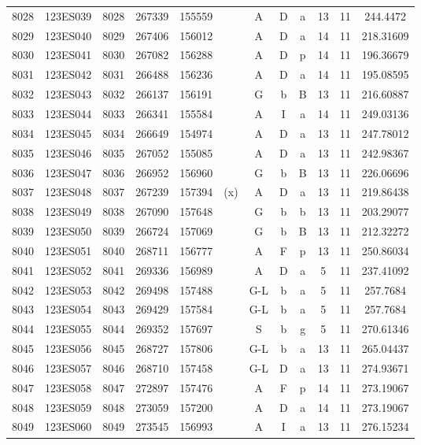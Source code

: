 \begin{tabular}{|*{12}{c|}}
8028 & 123ES039 & 8028 & 267339 & 155559 &  & A & D & a & 13 & 11 & 244.4472 \\ 
8029 & 123ES040 & 8029 & 267406 & 156012 &  & A & D & a & 14 & 11 & 218.31609 \\ 
8030 & 123ES041 & 8030 & 267082 & 156288 &  & A & D & p & 14 & 11 & 196.36679 \\ 
8031 & 123ES042 & 8031 & 266488 & 156236 &  & A & D & a & 14 & 11 & 195.08595 \\ 
8032 & 123ES043 & 8032 & 266137 & 156191 &  & G & b & B & 13 & 11 & 216.60887 \\ 
8033 & 123ES044 & 8033 & 266341 & 155584 &  & A & I & a & 14 & 11 & 249.03136 \\ 
8034 & 123ES045 & 8034 & 266649 & 154974 &  & A & D & a & 13 & 11 & 247.78012 \\ 
8035 & 123ES046 & 8035 & 267052 & 155085 &  & A & D & a & 13 & 11 & 242.98367 \\ 
8036 & 123ES047 & 8036 & 266952 & 156960 &  & G & b & B & 13 & 11 & 226.06696 \\ 
8037 & 123ES048 & 8037 & 267239 & 157394 & (x) & A & D & a & 13 & 11 & 219.86438 \\ 
8038 & 123ES049 & 8038 & 267090 & 157648 &  & G & b & b & 13 & 11 & 203.29077 \\ 
8039 & 123ES050 & 8039 & 266724 & 157069 &  & G & b & B & 13 & 11 & 212.32272 \\ 
8040 & 123ES051 & 8040 & 268711 & 156777 &  & A & F & p & 13 & 11 & 250.86034 \\ 
8041 & 123ES052 & 8041 & 269336 & 156989 &  & A & D & a & 5 & 11 & 237.41092 \\ 
8042 & 123ES053 & 8042 & 269498 & 157488 &  & G-L & b & a & 5 & 11 & 257.7684 \\ 
8043 & 123ES054 & 8043 & 269429 & 157584 &  & G-L & b & a & 5 & 11 & 257.7684 \\ 
8044 & 123ES055 & 8044 & 269352 & 157697 &  & S & b & g & 5 & 11 & 270.61346 \\ 
8045 & 123ES056 & 8045 & 268727 & 157806 &  & G-L & b & a & 13 & 11 & 265.04437 \\ 
8046 & 123ES057 & 8046 & 268710 & 157458 &  & G-L & D & a & 13 & 11 & 274.93671 \\ 
8047 & 123ES058 & 8047 & 272897 & 157476 &  & A & F & p & 14 & 11 & 273.19067 \\ 
8048 & 123ES059 & 8048 & 273059 & 157200 &  & A & D & a & 14 & 11 & 273.19067 \\ 
8049 & 123ES060 & 8049 & 273545 & 156993 &  & A & I & a & 13 & 11 & 276.15234 \\ 

\end{tabular}
